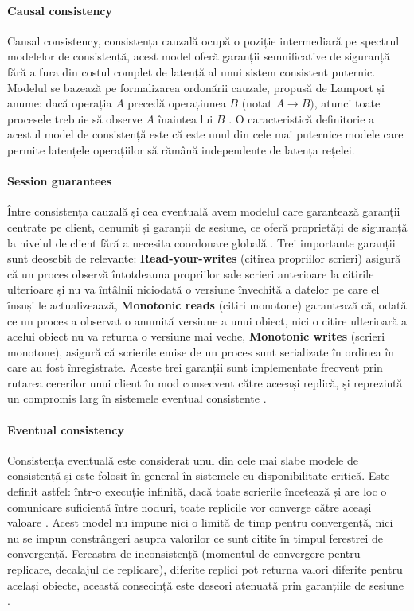 \paragraph{Causal consistency}

Causal consistency, consistența cauzală ocupă o poziție intermediară pe spectrul modelelor de consistență, acest model oferă garanții semnificative de siguranță fără a fura din costul complet de latență al unui sistem consistent puternic. Modelul se bazează pe formalizarea ordonării cauzale, propusă de Lamport și anume: dacă operația $A$ precedă operațiunea $B$ (notat $A \rightarrow B)$, atunci toate procesele trebuie să observe $A$ înaintea lui $B$ \cite{lamport1978}. O caracteristică definitorie a acestul model de consistență este că este unul din cele mai puternice modele care permite latențele operațiilor să rămână independente de latența rețelei.

\paragraph{Session guarantees}

Între consistența cauzală și cea eventuală avem modelul care garantează garanții centrate pe client, denumit și garanții de sesiune, ce oferă proprietăți de siguranță la nivelul de client fără a necesita coordonare globală \cite{vogels2009}. Trei importante garanții sunt deosebit de relevante: \textbf{Read-your-writes} (citirea propriilor scrieri) asigură că un proces observă întotdeauna propriilor sale scrieri anterioare la citirile ulterioare și nu va întâlnii niciodată o versiune învechită a datelor pe care el însuși le actualizeaază, \textbf{Monotonic reads} (citiri monotone) garantează că, odată ce un proces a observat o anumită versiune a unui obiect, nici o citire ulterioară a acelui obiect nu va returna o versiune mai veche, \textbf{Monotonic writes} (scrieri monotone), asigură că scrierile emise de un proces sunt serializate în ordinea în care au fost înregistrate. Aceste trei garanții sunt implementate frecvent prin rutarea cererilor unui client în mod consecvent către aceeași replică, și reprezintă un compromis larg în sistemele eventual consistente \cite{vogels2009}.

\paragraph{Eventual consistency}

Consistența eventuală este considerat unul din cele mai slabe modele de consistență și este folosit în general în sistemele cu disponibilitate critică. Este definit astfel: într-o execuție infinită, dacă toate scrierile încetează și are loc o comunicare suficientă între noduri, toate replicile vor converge către aceași valoare \cite{vogels2009}. Acest model nu impune nici o limită de timp pentru convergență, nici nu se impun constrângeri asupra valorilor ce sunt citite în timpul ferestrei de convergență. Fereastra de inconsistență (momentul de convergere pentru replicare, decalajul de replicare), diferite replici pot returna valori diferite pentru același obiecte, această consecință este deseori atenuată prin garanțiile de sesiune \cite{vogels2009}.


